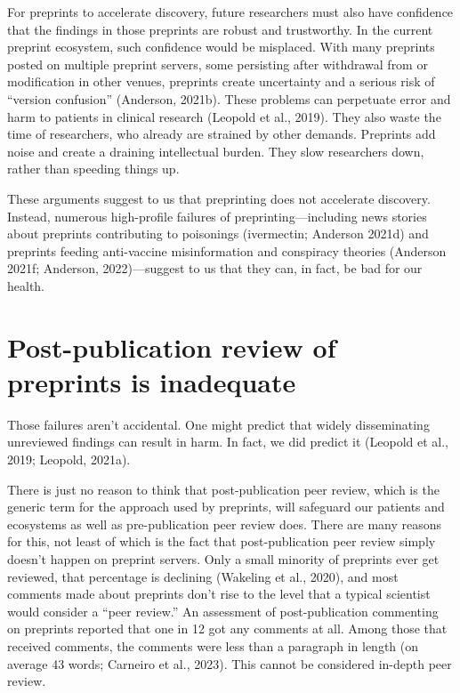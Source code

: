 \documentclass[authordate, perspective]{jote-new-article}
\begin{document}
	For preprints to accelerate discovery, future researchers must also have confidence that the findings in those preprints are robust and trustworthy. In the current preprint ecosystem, such confidence would be misplaced. With many preprints posted on multiple preprint servers, some persisting after withdrawal from or modification in other venues, preprints create uncertainty and a serious risk of “version confusion” (Anderson, 2021b). These problems can perpetuate error and harm to patients in clinical research (Leopold et al., 2019). They also waste the time of researchers, who already are strained by other demands. Preprints add noise and create a draining intellectual burden. They slow researchers down, rather than speeding things up.







	These arguments suggest to us that preprinting does not accelerate discovery. Instead, numerous high-profile failures of preprinting—including news stories about preprints contributing to poisonings (ivermectin; Anderson 2021d) and preprints feeding anti-vaccine misinformation and conspiracy theories (Anderson 2021f; Anderson,\textbf{ }2022)—suggest to us that they can, in fact, be bad for our health.







	\section{Post-publication review of preprints is inadequate}







	Those failures aren't accidental. One might predict that widely disseminating unreviewed findings can result in harm. In fact, we did predict it (Leopold et al., 2019; Leopold, 2021a).







	There is just no reason to think that post-publication peer review, which is the generic term for the approach used by preprints, will safeguard our patients and ecosystems as well as pre-publication peer review does. There are many reasons for this, not least of which is the fact that post-publication peer review simply doesn't happen on preprint servers. Only a small minority of preprints ever get reviewed, that percentage is declining (Wakeling et al., 2020), and most comments made about preprints don't rise to the level that a typical scientist would consider a “peer review.” An assessment of post-publication commenting on preprints reported that one in 12 got any comments at all. Among those that received comments, the comments were less than a paragraph in length (on average 43 words; Carneiro et al., 2023). This cannot be considered in-depth peer review.
\end{document}
